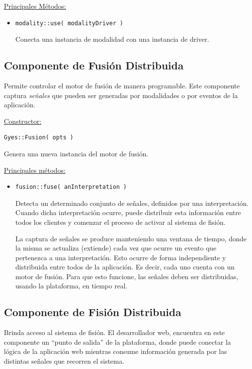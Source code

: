 \underline{\textsf{Principales Métodos:}}
\begin{itemize}
\item[]
\begin{lstlisting}
modality::use( modalityDriver )
\end{lstlisting}
Conecta una instancia de modalidad con una instancia de driver.
\end{itemize}

\subsection{Componente de Fusión Distribuida}

Permite controlar el motor de fusión de manera programable. Este componente captura \emph{señales} que pueden ser generadas por modalidades o por eventos de la aplicación.


\underline{\textsf{Constructor:}}
\begin{lstlisting}
Gyes::Fusion( opts )
\end{lstlisting}
Genera una nueva instancia del motor de fusión. 


\underline{\textsf{Principales métodos:}}
\begin{itemize}
\item[]
\begin{lstlisting}
fusion::fuse( anInterpretation )
\end{lstlisting}
Detecta un determinado conjunto de señales, definidos por una interpretación. Cuando dicha interpretación ocurre, puede distribuir esta información entre todos los clientes y comenzar el proceso de activar al sistema de fisión.

La captura de señales se produce manteniendo una ventana de tiempo, donde la misma se actualiza (extiende) cada vez que ocurre un evento que pertenezca a una interpretación. Esto ocurre de forma independiente y distribuida entre todos de la aplicación. Es decir, cada uno cuenta con un motor de fusión. Para que esto funcione, las señales deben ser distribuidas, usando la plataforma, en tiempo real.
\end{itemize}

\subsection{Componente de Fisión Distribuida}

Brinda acceso al sistema de fisión. El desarrollador web, encuentra en este componente un ``punto de salida'' de la plataforma, donde puede conectar la lógica de la aplicación web mientras consume información generada por las distintas señales que recorren el sistema.



